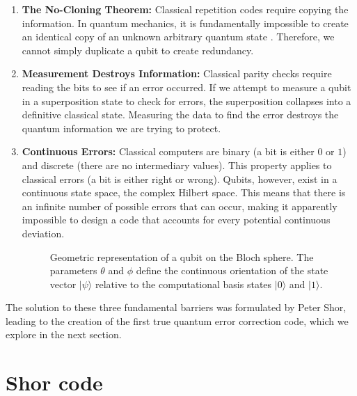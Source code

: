 \begin{enumerate}
    \item \textbf{The No-Cloning Theorem:} Classical repetition codes require copying the information. In quantum mechanics, it is fundamentally impossible to create an identical copy of an unknown arbitrary quantum state \cite{wootters1982single}. Therefore, we cannot simply duplicate a qubit to create redundancy.
    \item \textbf{Measurement Destroys Information:} Classical parity checks require reading the bits to see if an error occurred. If we attempt to measure a qubit in a superposition state to check for errors, the superposition collapses into a definitive classical state. Measuring the data to find the error destroys the quantum information we are trying to protect.
    \item \textbf{Continuous Errors:} Classical computers are binary (a bit is either $0$ or $1$) and discrete (there are no intermediary values). This property applies to classical errors (a bit is either right or wrong). Qubits, however, exist in a continuous state space, the complex Hilbert space. This means that there is an infinite number of possible errors that can occur, making it apparently impossible to design a code that accounts for every potential continuous deviation.

\begin{figure}[hbt!]
\centering

\caption[Geometric representation of a qubit on the Bloch sphere.]{Geometric representation of a qubit on the Bloch sphere. The parameters $\theta$ and $\phi$ define the continuous orientation of the state vector $|\psi\rangle$ relative to the computational basis states $|0\rangle$ and $|1\rangle$.}
\label{fig:1:bloch_sphere}
\end{figure}
\end{enumerate}

The solution to these three fundamental barriers was formulated by Peter Shor, leading to the creation of the first true quantum error correction code, which we explore in the next section.

\section{Shor code}
\label{sec:shor_codes}

